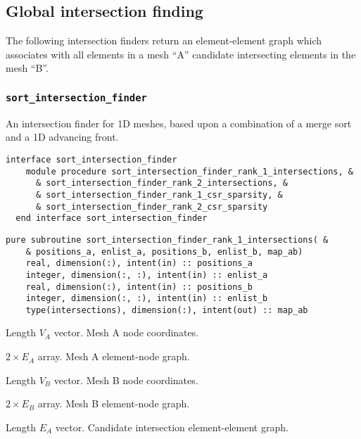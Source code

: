 \documentclass{article}
\begin{document}
\subsection{Global intersection finding}

The following intersection finders return an element-element graph which
associates with all elements in a mesh ``A'' candidate intersecting elements in
the mesh ``B''. 

\subsubsection{\texttt{sort\_intersection\_finder}}

An intersection finder for 1D meshes, based upon a combination of a merge sort
and a 1D advancing front.

\begin{lstlisting}[language=FORTRAN]
  interface sort_intersection_finder
    module procedure sort_intersection_finder_rank_1_intersections, &
      & sort_intersection_finder_rank_2_intersections, &
      & sort_intersection_finder_rank_1_csr_sparsity, &
      & sort_intersection_finder_rank_2_csr_sparsity
  end interface sort_intersection_finder
\end{lstlisting}

\begin{lstlisting}[language=FORTRAN]
  pure subroutine sort_intersection_finder_rank_1_intersections( &
    & positions_a, enlist_a, positions_b, enlist_b, map_ab)
    real, dimension(:), intent(in) :: positions_a
    integer, dimension(:, :), intent(in) :: enlist_a
    real, dimension(:), intent(in) :: positions_b
    integer, dimension(:, :), intent(in) :: enlist_b
    type(intersections), dimension(:), intent(out) :: map_ab
\end{lstlisting}

\begin{description}[font=\ttfamily\bfseries,leftmargin=2.2\parindent,labelindent=1.7\parindent,noitemsep]
  \item[positions\_a] Length $V_A$ vector. Mesh A node coordinates.
  \item[enlist\_a] $2 \times E_A$ array. Mesh A element-node graph.
  \item[positions\_b] Length $V_B$ vector. Mesh B node coordinates.
  \item[enlist\_b] $2 \times E_B$ array. Mesh B element-node graph.
  \item[map\_ab] Length $E_A$ vector. Candidate intersection element-element
    graph.
\end{description}
\end{document}
